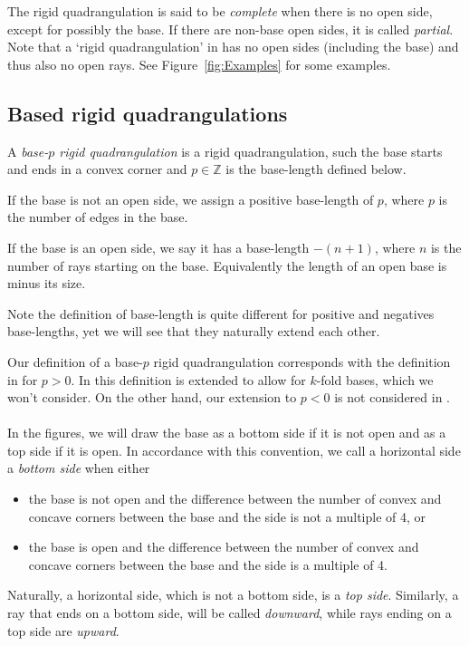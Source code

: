 \documentclass[11pt]{article}
\theoremstyle{plain}
\theoremstyle{definition}
\newcommand{\Z}{\mathbb{Z}}
\begin{document}
The rigid quadrangulation is said to be \emph{complete} when there is no open side, except for possibly the base. 
If there are non-base open sides, it is called \emph{partial}.
Note that a `rigid quadrangulation' in \cite{Budd_rectilinear_2025} has no open sides (including the base) and thus also no open rays. 
See Figure~\ref{fig:Examples} for some examples. 

\subsection{Based rigid quadrangulations}
A \emph{base-$p$ rigid quadrangulation} is a rigid quadrangulation, such the base starts and ends in a convex corner and $p\in\Z$ is the base-length defined below.

If the base is not an open side, we assign a positive base-length of $p$, where $p$ is the number of edges in the base.

If the base is an open side, we say it has a base-length $-(n+1)$, where $n$ is the number of rays starting on the base. Equivalently the length of an open base is minus its size.

Note the definition of base-length is quite different for positive and negatives base-lengths, yet we will see that they naturally extend each other.

Our definition of a base-$p$ rigid quadrangulation corresponds with the definition in \cite{Budd_rectilinear_2025} for $p>0$. 
In \cite{Budd_rectilinear_2025} this definition is extended to allow for $k$-fold bases, which we won't consider.
On the other hand, our extension to $p<0$ is not considered in \cite{Budd_rectilinear_2025}.
\\\\
In the figures, we will draw the base as a bottom side if it is not open and as a top side if it is open.
In accordance with this convention, we call a horizontal side a \emph{bottom side} when either
\begin{itemize}[nosep]
    \item the base is not open and the difference between the number of convex and concave corners between the base and the side is not a multiple of 4, or
    \item the base is open and the difference between the number of convex and concave corners between the base and the side is a multiple of 4.
\end{itemize}
Naturally, a horizontal side, which is not a bottom side, is a \emph{top side}.   
Similarly, a ray that ends on a bottom side, will be called \emph{downward}, while rays ending on a top side are \emph{upward}. 
\end{document}

